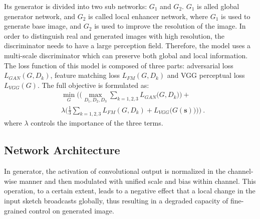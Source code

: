 \documentclass[10pt,twocolumn,letterpaper]{article}
\begin{document}
Its generator is divided into two sub networks: $G_1$ and $G_2$. $G_1$ is alled global generator network, and $G_2$ is called local enhancer network, where $G_1$ is used to generate base image, and $G_2$ is used to improve the resolution of the image. In order to distinguish real and generated images with high resolution, the discriminator needs to have a large perception field. Therefore, the model uses a multi-scale discriminator which can preserve both global and local information. The loss function of this model is composed of three parts: adversarial loss $L_{GAN}(G,D_k)$, feature matching loss $L_{FM}(G,D_k)$ and VGG perceptual loss $L_{VGG}(G)$. The full objective is formulated as:
\begin{equation}
\begin{split}
	&\underset{G}{\min}\Bigg(\bigg(\underset{D_1,D_2,D_3}{\max} \sum_{k=1,2,3}{L_{GAN}\big(G,D_k\big)}\bigg)+  \\
	&\lambda \bigg(\frac{1}{3}\sum_{k=1,2,3}{L_{FM}(G,D_k)}+L_{VGG}{\big(G(\boldsymbol{s})\big)}\bigg)\Bigg)~.
\end{split}
\end{equation}
\noindent
where $\lambda$ controls the importance of the three terms.

\subsection{Network Architecture}
In generator, the activation of convolutional output is normalized in the channel-wise manner and then modulated with unified scale and bias within channel. This operation, to a certain extent, leads to a negative effect that a local change in the input sketch broadcasts globally, thus resulting in a degraded capacity of fine-grained control on generated image.
 
\end{document}
